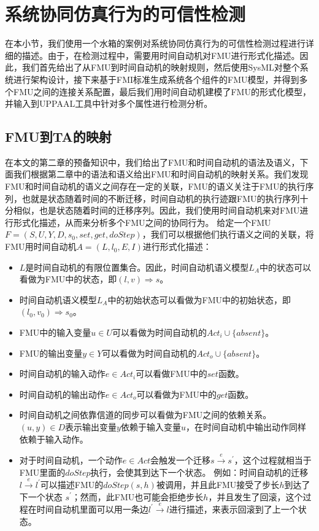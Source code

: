 \section{系统协同仿真行为的可信性检测}
在本小节，我们使用一个水箱的案例对系统协同仿真行为的可信性检测过程进行详细的描述。由于，在检测过程中，需要用时间自动机对FMU进行形式化描述。因此，我们首先给出了从FMU到时间自动机的映射规则，然后使用SysML对整个系统进行架构设计，接下来基于FMI标准生成系统各个组件的FMU模型，并得到多个FMU之间的连接关系配置，最后我们用时间自动机建模了FMU的形式化模型，并输入到UPPAAL工具中针对多个属性进行检测分析。
\subsection{FMU到TA的映射} 
\label{sec:encode}
在本文的第二章的预备知识中，我们给出了FMU和时间自动机的语法及语义，下面我们根据第二章中的语法和语义给出FMU和时间自动机的映射关系。我们发现FMU和时间自动机的语义之间存在一定的关联，FMU的语义关注于FMU的执行序列，也就是状态随着时间的不断迁移，时间自动机的执行迹跟FMU的执行序列十分相似，也是状态随着时间的迁移序列。因此，我们使用时间自动机来对FMU进行形式化描述，从而来分析多个FMU之间的协同行为。
给定一个FMU$F=(S,U,Y,D,s_{0},set,get,doStep)$，我们可以根据他们执行语义之间的关联，将FMU用时间自动机$\textit{A}=(L,l_{0},E,I)$进行形式化描述：
\begin{itemize}
\item
$L$是时间自动机的有限位置集合。因此，时间自动机语义模型$L_{\textit{A}}$中的状态可以看做为FMU中的状态，即$(l,v) \Rightarrow s$。
\item
时间自动机语义模型$L_{\textit{A}}$中的初始状态可以看做为FMU中的初始状态，即$(l_{0},v_{0}) \Rightarrow s_{0}$。
\item
FMU中的输入变量$u \in U$可以看做为时间自动机的$Act_{i} \cup \{absent\}$。
\item
FMU的输出变量$y \in Y$可以看做为时间自动机的$Act_{o} \cup \{absent\}$。
\item
时间自动机的输入动作$e \in Act_{i}$可以看做FMU中的$set$函数。
\item
时间自动机的输出动作$e \in Act_{o}$可以看做为FMU中的$get$函数。  
\item
时间自动机之间依靠信道的同步可以看做为FMU之间的依赖关系。 $(u,y) \in D$表示输出变量$y$依赖于输入变量$u$，在时间自动机中输出动作同样依赖于输入动作。
\item
对于时间自动机，一个动作$e \in Act$会触发一个迁移$s \xrightarrow{e} s^{\prime}$，这个过程就相当于FMU里面的$doStep$执行，会使其到达下一个状态。 例如：时间自动机的迁移$l \xrightarrow{e} l^{\prime}$可以描述FMU的$doStep(s,h)$被调用，并且此FMU接受了步长$h$到达了下一个状态 $s^{\prime}$；然而，此FMU也可能会拒绝步长$h$，并且发生了回滚，这个过程在时间自动机里面可以用一条边$l^{\prime} \xrightarrow{e} l$进行描述，来表示回滚到了上一个状态。

\end{itemize}
